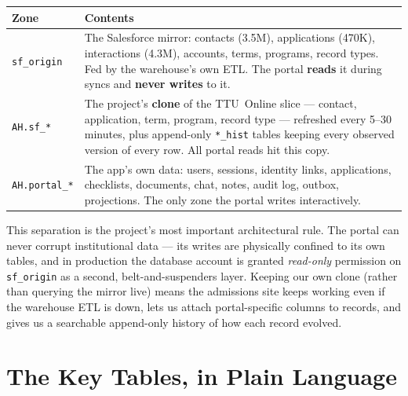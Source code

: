 \documentclass[11pt,letterpaper]{report}
\begin{document}
\begin{center}
\begin{tabularx}{\textwidth}{lX}
\toprule
\textbf{Zone} & \textbf{Contents} \\
\midrule
\texttt{sf\_origin} & The Salesforce mirror: contacts (3.5M), applications
(470K), interactions (4.3M), accounts, terms, programs, record types. Fed by
the warehouse's own ETL. The portal \textbf{reads} it during syncs and
\textbf{never writes} to it. \\
\texttt{AH.sf\_*} & The project's \textbf{clone} of the TTU~Online slice ---
contact, application, term, program, record type --- refreshed every 5--30
minutes, plus append-only \texttt{*\_hist} tables keeping every observed
version of every row. All portal reads hit this copy. \\
\texttt{AH.portal\_*} & The app's own data: users, sessions, identity links,
applications, checklists, documents, chat, notes, audit log, outbox,
projections. The only zone the portal writes interactively. \\
\bottomrule
\end{tabularx}
\end{center}

This separation is the project's most important architectural rule. The portal
can never corrupt institutional data --- its writes are physically confined to
its own tables, and in production the database account is granted
\emph{read-only} permission on \texttt{sf\_origin} as a second,
belt-and-suspenders layer. Keeping our own clone (rather than querying the
mirror live) means the admissions site keeps working even if the warehouse ETL
is down, lets us attach portal-specific columns to records, and gives us a
searchable append-only history of how each record evolved.

\section{The Key Tables, in Plain Language}
\end{document}
